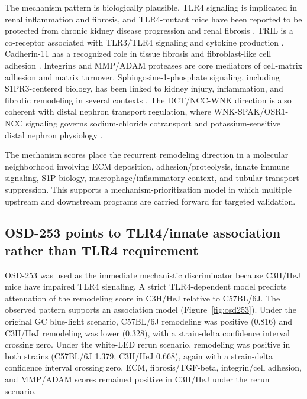 \documentclass[11pt]{article}
\begin{document}
The mechanism pattern is biologically plausible. TLR4 signaling is implicated in renal inflammation and fibrosis, and TLR4-mutant mice have been reported to be protected from chronic kidney disease progression and renal fibrosis \citep{souza2015tlr4}. TRIL is a co-receptor associated with TLR3/TLR4 signaling and cytokine production \citep{carpenter2009tril,wochal2014tril,carpenter2011tril}. Cadherin-11 has a recognized role in tissue fibrosis and fibroblast-like cell adhesion \citep{chavula2022cadherin}. Integrins and MMP/ADAM proteases are core mediators of cell-matrix adhesion and matrix turnover. Sphingosine-1-phosphate signaling, including S1PR3-centered biology, has been linked to kidney injury, inflammation, and fibrotic remodeling in several contexts \citep{s1p2017,s1p2020}. The DCT/NCC-WNK direction is also coherent with distal nephron transport regulation, where WNK-SPAK/OSR1-NCC signaling governs sodium-chloride cotransport and potassium-sensitive distal nephron physiology \citep{castaneda2024dct,ge2016wnk}.

The mechanism scores place the recurrent remodeling direction in a molecular neighborhood involving ECM deposition, adhesion/proteolysis, innate immune signaling, S1P biology, macrophage/inflammatory context, and tubular transport suppression. This supports a mechanism-prioritization model in which multiple upstream and downstream programs are carried forward for targeted validation.

\subsection{OSD-253 points to TLR4/innate association rather than TLR4 requirement}

OSD-253 was used as the immediate mechanistic discriminator because C3H/HeJ mice have impaired TLR4 signaling. A strict TLR4-dependent model predicts attenuation of the remodeling score in C3H/HeJ relative to C57BL/6J. The observed pattern supports an association model (Figure~\ref{fig:osd253}). Under the original GC blue-light scenario, C57BL/6J remodeling was positive (0.816) and C3H/HeJ remodeling was lower (0.328), with a strain-delta confidence interval crossing zero. Under the white-LED rerun scenario, remodeling was positive in both strains (C57BL/6J 1.379, C3H/HeJ 0.668), again with a strain-delta confidence interval crossing zero. ECM, fibrosis/TGF-beta, integrin/cell adhesion, and MMP/ADAM scores remained positive in C3H/HeJ under the rerun scenario.
\end{document}
